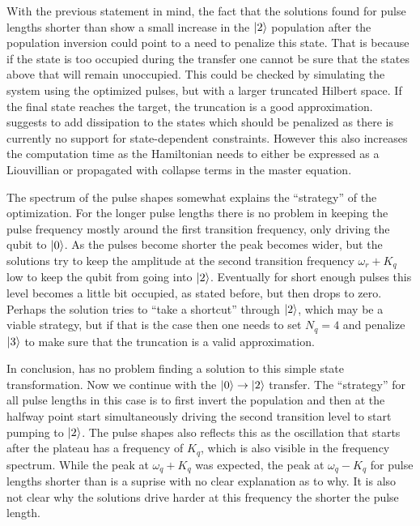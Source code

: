 \documentclass[main.tex]{subfiles}
\begin{document}
With the previous statement in mind, the fact that the solutions found for pulse lengths shorter than  show a small increase in the \(\ket{2}\) population after the population inversion could point to a need to penalize this state.
That is because if the state is too occupied during the transfer one cannot be sure that the states above that will remain unoccupied.
This could be checked by simulating the system using the optimized pulses, but with a larger truncated Hilbert space.
If the final state reaches the target, the truncation is a good approximation.
\krotov{} suggests to add dissipation to the states which should be penalized as there is currently no support for state-dependent constraints.
However this also increases the computation time as the Hamiltonian needs to either be expressed as a Liouvillian or propagated with collapse terms in the master equation.

The spectrum of the pulse shapes somewhat explains the ``strategy'' of the optimization.
For the longer pulse lengths there is no problem in keeping the pulse frequency mostly around the first transition frequency, only driving the qubit to \(\ket{0}\).
As the pulses become shorter the peak becomes wider, but the solutions try to keep the amplitude at the second transition frequency \(\omega_r+K_q\) low to keep the qubit from going into \(\ket{2}\).
Eventually for short enough pulses this level becomes a little bit occupied, as stated before, but then drops to zero.
Perhaps the solution tries to ``take a shortcut'' through \(\ket{2}\), which may be a viable strategy, but if that is the case then one needs to set \(N_q = 4\) and penalize \(\ket{3}\) to make sure that the truncation is a valid approximation.

In conclusion, \krotov{} has no problem finding a solution to this simple state transformation.
Now we continue with the \(\ket{0}\rightarrow\ket{2}\) transfer.
The ``strategy'' for all pulse lengths in this case is to first invert the population and then at the halfway point start simultaneously driving the second transition level to start pumping to \(\ket{2}\).
The pulse shapes also reflects this as the oscillation that starts after the plateau has a frequency of \(K_q\), which is also visible in the frequency spectrum.
While the peak at \(\omega_q+K_q\) was expected, the peak at \(\omega_q-K_q\) for pulse lengths shorter than  is a suprise with no clear explanation as to why.
It is also not clear why the solutions drive harder at this frequency the shorter the pulse length.
\end{document}
